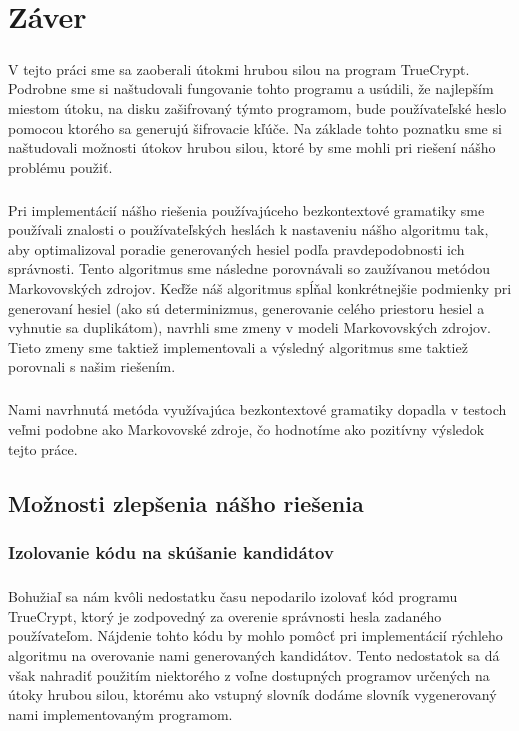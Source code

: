 \chapter{Záver}

\paragraph{}
V tejto práci sme sa zaoberali útokmi hrubou silou na program TrueCrypt. Podrobne sme si naštudovali fungovanie tohto programu a usúdili, že najlepším miestom útoku, na disku zašifrovaný týmto programom, bude používateľské heslo pomocou ktorého sa generujú šifrovacie kľúče. Na základe tohto poznatku sme si naštudovali možnosti útokov hrubou silou, ktoré by sme mohli pri riešení nášho problému použiť.

\paragraph{}
Pri implementácií nášho riešenia používajúceho bezkontextové gramatiky sme používali znalosti o používateľských heslách k nastaveniu nášho algoritmu tak, aby optimalizoval poradie generovaných hesiel podľa pravdepodobnosti ich správnosti. Tento algoritmus sme následne porovnávali so zaužívanou metódou Markovovských zdrojov. Keďže náš algoritmus spĺňal konkrétnejšie podmienky pri generovaní hesiel (ako sú determinizmus, generovanie celého priestoru hesiel a vyhnutie sa duplikátom), navrhli sme zmeny v modeli Markovovských zdrojov. Tieto zmeny sme taktiež implementovali a výsledný algoritmus sme taktiež porovnali s našim riešením.

\paragraph{}
Nami navrhnutá metóda využívajúca bezkontextové gramatiky dopadla v testoch veľmi podobne ako Markovovské zdroje, čo hodnotíme ako pozitívny výsledok tejto práce.

\section{Možnosti zlepšenia nášho riešenia}
\subsection{Izolovanie kódu na skúšanie kandidátov}
\paragraph{}
Bohužiaľ sa nám kvôli nedostatku času nepodarilo izolovať kód programu TrueCrypt, ktorý je zodpovedný za overenie správnosti hesla zadaného používateľom. Nájdenie tohto kódu by mohlo pomôcť pri implementácií rýchleho algoritmu na overovanie nami generovaných kandidátov. Tento nedostatok sa dá však nahradiť použitím niektorého z voľne dostupných programov určených na útoky hrubou silou, ktorému ako vstupný slovník dodáme slovník vygenerovaný nami implementovaným programom.

